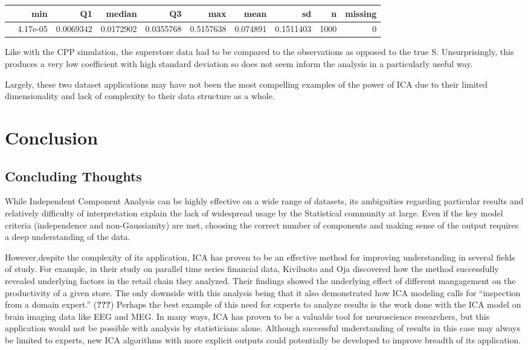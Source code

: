 \documentclass[12pt,twoside]{amherstthesis}
\begin{document}
  \begin{longtable}[]{@{}lrrrrrrrrr@{}}
  \toprule
  & min & Q1 & median & Q3 & max & mean & sd & n & missing\tabularnewline
  \midrule
  \endhead
  & 4.17e-05 & 0.0069342 & 0.0172902 & 0.0355768 & 0.5157638 & 0.074891 &
  0.1511403 & 1000 & 0\tabularnewline
  \bottomrule
  \end{longtable}
  
  Like with the CPP simulation, the superstore data had to be compared to
  the observations as opposed to the true S. Unsurprisingly, this produces
  a very low coefficient with high standard deviation so does not seem
  inform the analysis in a particularly useful way.
  
  Largely, these two dataset applications may have not been the most
  compelling examples of the power of ICA due to their limited
  dimensionality and lack of complexity to their data structure as a
  whole.
  
  \chapter*{Conclusion}\label{conclusion}
  
  \setcounter{chapter}{4} \setcounter{section}{0}
  
  \section{Concluding Thoughts}\label{concluding-thoughts}
  
  While Independent Component Analysis can be highly effective on a wide
  range of datasets, its ambiguities regarding particular results and
  relatively difficulty of interpretation explain the lack of widespread
  usage by the Statistical community at large. Even if the key model
  criteria (independence and non-Gaussianity) are met, choosing the
  correct number of components and making sense of the output requires a
  deep understanding of the data.
  
  However,despite the complexity of its application, ICA has proven to be
  an effective method for improving understanding in several fields of
  study. For example, in their study on parallel time series financial
  data, Kiviluoto and Oja discovered how the method successfully revealed
  underlying factors in the retail chain they analyzed. Their findings
  showed the underlying effect of different mangagement on the
  productivity of a given store. The only downside with this analysis
  being that it also demonstrated how ICA modeling calls for ``inspection
  from a domain expert.'' ({\textbf{???}}) Perhaps the best example of
  this need for experts to analyze results is the work done with the ICA
  model on brain imaging data like EEG and MEG. In many ways, ICA has
  proven to be a valuable tool for neuroscience researchers, but this
  application would not be possible with analysis by statisticians alone.
  Although successful understanding of results in this case may always be
  limited to experts, new ICA algorithms with more explicit outputs could
  potentially be developed to improve breadth of its application.
  
\end{document}
